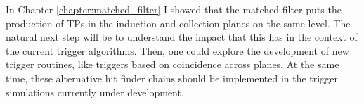 \begin{comment}
The DAQ system of the DUNE FD relies on the online identification of hits on channels, the so-called TPs, to form decisions data to store. The goal of Chapter \ref{chapter:matched_filter} is to motivate a method to enhance the production of TPs in the induction channels of the detectors. Forming TPs from all the charge readout planes will improve the redundancy of the trigger algorithms. Not only that, but this may be the key to have more complex trigger logic that requires directional information. The aspect I focused on to improve the hit finding is the filtering of the waveforms. In section \ref{sec:matched_filter_fir} I use a sample of ProtoDUNE-SP cosmic data to show how different low-pass FIR filters affect the S/N in the collection and induction planes. Then, I introduce the concept of the matched filter in section \ref{sec:matched_filter_matched_filter}. Using the same dataset, I demonstrate that the improvement in the S/N of the induction channels achieved with these filters can be significantly higher than with the standard filter approach. A series of studies using MC samples are presented in section \ref{sec:matched_filter_mc_studies}. These allow to study the dependence of the filtering on the orientation and the energy of the tracks. I also use them to assess the impact of this method on the hit sensitivity. Finally, in section \ref{sec:matched_filter_vdcoldbox} I briefly summarise the results from the VD ColdBox runs which featured the matched filter.

With these studies, I showed that the matched filter puts the production of TPs in the induction and collection planes on the same level. The natural next step will be to understand the impact that this has in the context of the current trigger algorithms. Then, explore the development of new trigger routines, like triggers based on coincidence across planes. At the same time, these alternative hit finder chains should be implemented in the trigger simulations currently under development.
\end{comment}

In Chapter \ref{chapter:matched_filter} I showed that the matched filter puts the production of TPs in the induction and collection planes on the same level. The natural next step will be to understand the impact that this has in the context of the current trigger algorithms. Then, one could explore the development of new trigger routines, like triggers based on coincidence across planes. At the same time, these alternative hit finder chains should be implemented in the trigger simulations currently under development.

